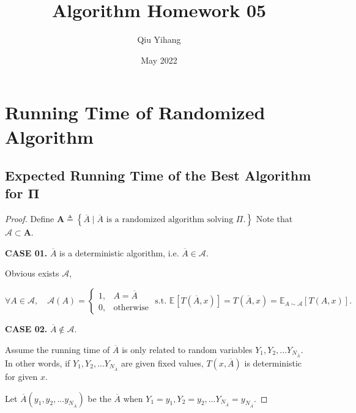\documentclass{article}
\title{\textbf{Algorithm Homework 05}}
\author{Qiu Yihang}
\date{May 2022}
\newcommand{\set}[1]{\left\{#1\right\}}
\newcommand{\staExp}[2]{\mathbb{E}_{#1}\left[#2\right]}
\begin{document}
\maketitle

\section{Running Time of Randomized Algorithm}
\vspace{1em}
\subsection{Expected Running Time of the Best Algorithm for $\boldsymbol{\Pi}$}
\vspace{1em}
\begin{proof}
    Define $\mathbf{A}\triangleq\set{\overline{A}\mid\overline{A}\text{ is a randomized algorithm solving }\Pi.}$
    Note that $\mathcal{A}\subset\mathbf{A}$.

    \vspace{1em} \hspace{1.3em}
    \textbf{CASE 01.} $\overline{A}$ is a deterministic algorithm, i.e. $\overline{A}\in\mathcal{A}$. 
    
    \hspace{1.3em}
    Obvious exists $\mathscr{A}$,
    
    \vspace{-2.5em}
    $$\forall A\in\mathcal{A},\quad\mathscr{A}(A)=\left\{\begin{array}{ll}
        1, & A=\overline{A} \\
        0, & \text{otherwise}
    \end{array}\right.\text{ s.t. }\staExp{}{T(\overline{A},x)}=T(\overline{A},x)=\staExp{A\sim\mathscr{A}}{T(A,x)}.\quad$$
    
    \vspace{0.5em} \hspace{1.3em}
    \textbf{CASE 02.} $\overline{A}\notin\mathcal{A}$.
    
    \hspace{1.3em}
    Assume the running time of $\overline{A}$ is only related to random variables $Y_1,Y_2,...Y_{N_{\overline{A}}}.$ 
    In other words, if $Y_1,Y_2,...Y_{N_{\overline{A}}}$ are given fixed values, $T(x,\overline{A})$ is deterministic for given $x$.
    
    \hspace{1.3em}
    Let $\overline{A}(y_1,y_2,...y_{N_{\overline{A}}})$ be the $\overline{A}$ when $Y_1=y_1,Y_2=y_2,...Y_{N_{\overline{A}}}=y_{N_{\overline{A}}}$.
    

\end{proof}
\end{document}
